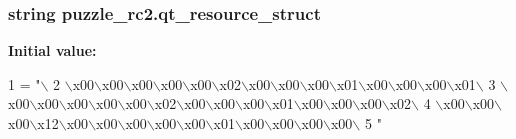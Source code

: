 \subsubsection[{qt\+\_\+resource\+\_\+struct}]{\setlength{\rightskip}{0pt plus 5cm}string puzzle\+\_\+rc2.\+qt\+\_\+resource\+\_\+struct}\label{namespacepuzzle__rc2_a47a71ee6a62e6656c84a56157fb2cf6b}
{\bfseries Initial value\+:}
\begin{DoxyCode}
1 = \textcolor{stringliteral}{"\(\backslash\)}
2 \textcolor{stringliteral}{\(\backslash\)x00\(\backslash\)x00\(\backslash\)x00\(\backslash\)x00\(\backslash\)x00\(\backslash\)x02\(\backslash\)x00\(\backslash\)x00\(\backslash\)x00\(\backslash\)x01\(\backslash\)x00\(\backslash\)x00\(\backslash\)x00\(\backslash\)x01\(\backslash\)}
3 \textcolor{stringliteral}{\(\backslash\)x00\(\backslash\)x00\(\backslash\)x00\(\backslash\)x00\(\backslash\)x00\(\backslash\)x02\(\backslash\)x00\(\backslash\)x00\(\backslash\)x00\(\backslash\)x01\(\backslash\)x00\(\backslash\)x00\(\backslash\)x00\(\backslash\)x02\(\backslash\)}
4 \textcolor{stringliteral}{\(\backslash\)x00\(\backslash\)x00\(\backslash\)x00\(\backslash\)x12\(\backslash\)x00\(\backslash\)x00\(\backslash\)x00\(\backslash\)x00\(\backslash\)x00\(\backslash\)x01\(\backslash\)x00\(\backslash\)x00\(\backslash\)x00\(\backslash\)x00\(\backslash\)}
5 \textcolor{stringliteral}{"}
\end{DoxyCode}

